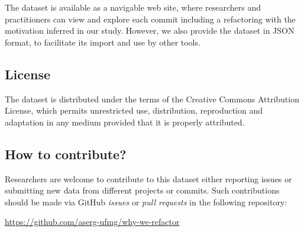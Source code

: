 The dataset is available as a navigable web site, where researchers and practitioners can view and explore each commit including a refactoring with the motivation inferred in our study. However, we also provide the dataset in JSON format, to facilitate its import and use by other tools.

\subsection{License}

\noindent The dataset is distributed under the terms of the Creative Commons Attribution License, which permits unrestricted use, distribution, reproduction and adaptation in any me\-di\-um
provided that it is properly attributed.\\



\subsection{How to contribute?}

Researchers are welcome to contribute to this dataset either reporting issues or submitting new data from different projects or commits. Such contributions should be made via GitHub \emph{issues} or \emph{pull requests} in the following repository:\margin

\noindent \url{https://github.com/aserg-ufmg/why-we-refactor}\margin



